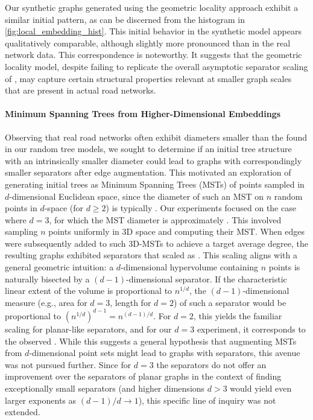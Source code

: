 Our synthetic graphs generated using the geometric locality approach exhibit a similar initial pattern, as can be discerned from the histogram in \cref{fig:local_embedding_hist}.
This initial behavior in the synthetic model appears qualitatively comparable, although slightly more pronounced than in the real network data.
This correspondence is noteworthy.
It suggests that the geometric locality model, despite failing to replicate the overall asymptotic separator scaling of , may capture certain structural properties relevant at smaller graph scales that are present in actual road networks.




\paragraph{Minimum Spanning Trees from Higher-Dimensional Embeddings}
\label{sec:synthetic:mst}
Observing that real road networks often exhibit diameters smaller than the  found in our random tree models, we sought to determine if an initial tree structure with an intrinsically smaller diameter could lead to graphs with correspondingly smaller separators after edge augmentation.
This motivated an exploration of generating initial trees as Minimum Spanning Trees (MSTs) of points sampled in \(d\)-dimensional Euclidean space, since the diameter of such an MST on \(n\) random points in \(d\)-space (for \(d \ge 2\)) is typically .
Our experiments focused on the case where \(d=3\), for which the MST diameter is approximately .
This involved sampling \(n\) points uniformly in 3D space and computing their MST.
When edges were subsequently added to such 3D-MSTs to achieve a target average degree, the resulting graphs exhibited separators that scaled as .
This scaling aligns with a general geometric intuition: a \(d\)-dimensional hypervolume containing \(n\) points is naturally bisected by a \((d-1)\)-dimensional separator.
If the characteristic linear extent of the volume is proportional to \(n^{1/d}\), the \((d-1)\)-dimensional measure (e.g., area for \(d=3\), length for \(d=2\)) of such a separator would be proportional to \((n^{1/d})^{d-1} = n^{(d-1)/d}\).
For \(d=2\), this yields the familiar  scaling for planar-like separators, and for our \(d=3\) experiment, it corresponds to the observed .
While this suggests a general hypothesis that augmenting MSTs from \(d\)-dimensional point sets might lead to graphs with  separators, this avenue was not pursued further.
Since for \(d=3\) the  separators do not offer an improvement over the  separators of planar graphs in the context of finding exceptionally small separators (and higher dimensions \(d > 3\) would yield even larger exponents as \((d-1)/d \to 1\)), this specific line of inquiry was not extended.






